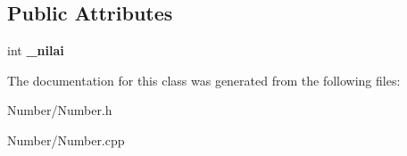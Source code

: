 \subsection*{Public Attributes}
\begin{DoxyCompactItemize}
\item 
\hypertarget{class_number_a791a5c270a2b76eb73dbae4aef7fc114}{}int {\bfseries \+\_\+nilai}\label{class_number_a791a5c270a2b76eb73dbae4aef7fc114}

\end{DoxyCompactItemize}


The documentation for this class was generated from the following files\+:\begin{DoxyCompactItemize}
\item 
Number/Number.\+h\item 
Number/Number.\+cpp\end{DoxyCompactItemize}
